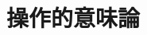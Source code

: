 \documentclass[a4j, dvipdfmx]{jsarticle}
\theoremstyle{definition}
\newcommand{\semantics}[1]{[\![ #1 ]\!]}
\begin{document}

\newpage

\section{操作的意味論}
\end{document}
